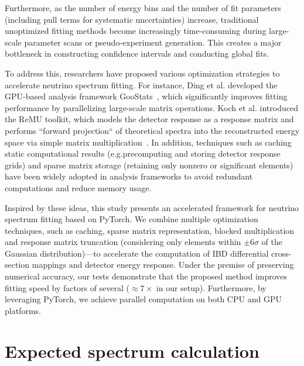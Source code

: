 \documentclass[xetex,twocolumn,epjc3]{svjour3}
\begin{document}
Furthermore, as the number of energy bins and the number of fit parameters (including pull terms for systematic uncertainties) increase, traditional unoptimized fitting methods become increasingly time-consuming during large-scale parameter scans or pseudo-experiment generation. This creates a major bottleneck in constructing confidence intervals and conducting global fits.

To address this, researchers have proposed various optimization strategies to accelerate neutrino spectrum fitting. For instance, Ding et al. developed the GPU-based analysis framework GooStats~\cite{Ding_2018}, which significantly improves fitting performance by parallelizing large-scale matrix operations. Koch et al. introduced the ReMU toolkit, which models the detector response as a response matrix and performs ``forward projection`` of theoretical spectra into the reconstructed energy space via simple matrix multiplication~\cite{Koch2019}. In addition, techniques such as caching static computational results (e.g.precomputing and storing detector response grids) and sparse matrix storage (retaining only nonzero or significant elements) have been widely adopted in analysis frameworks to avoid redundant computations and reduce memory usage.

Inspired by these ideas, this study presents an accelerated framework for neutrino spectrum fitting based on PyTorch. We combine multiple optimization techniques, such as caching, sparse matrix representation, blocked multiplication and response matrix truncation (considering only elements within $\pm6\sigma$ of the Gaussian distribution)—to accelerate the computation of IBD differential cross-section mappings and detector energy response. Under the premise of preserving numerical accuracy, our tests demonstrate that the proposed method improves fitting speed by factors of several ($\approx 7 \times$ in our setup). Furthermore, by leveraging PyTorch, we achieve parallel computation on both CPU and GPU platforms.



\section{Expected spectrum calculation}
\label{sec:intro}
\end{document}
